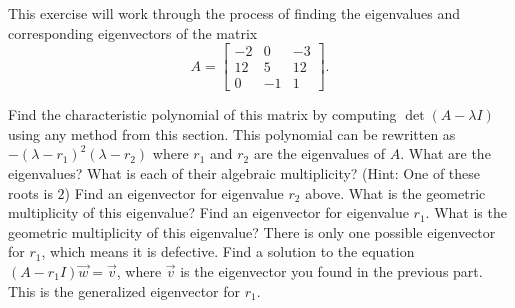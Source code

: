 \begin{exercise}\ansMark%
This exercise will work through the process of finding the eigenvalues and corresponding eigenvectors of the matrix
\begin{equation*}
A = \begin{bmatrix}
-2 & 0 & -3 \\ 12 & 5  & 12 \\ 0 &-1 & 1
\end{bmatrix}.
\end{equation*}
\begin{tasks}
\task Find the characteristic polynomial of this matrix by computing $\det(A - \lambda I)$ using any method from this section.
\task This polynomial can be rewritten as $-(\lambda - r_1)^2(\lambda - r_2)$ where $r_1$ and $r_2$ are the eigenvalues of $A$. What are the eigenvalues? What is each of their algebraic multiplicity? (Hint: One of these roots is $2$)
\task Find an eigenvector for eigenvalue $r_2$ above. What is the geometric multiplicity of this eigenvalue?
\task Find an eigenvector for eigenvalue $r_1$. What is the geometric multiplicity of this eigenvalue?
\task There is only one possible eigenvector for $r_1$, which means it is defective. Find a solution to the equation $(A - r_1 I) \vec{w} = \vec{v}$, where $\vec{v}$ is the eigenvector you found in the previous part. This is the generalized eigenvector for $r_1$. 
\end{tasks}
\end{exercise}

